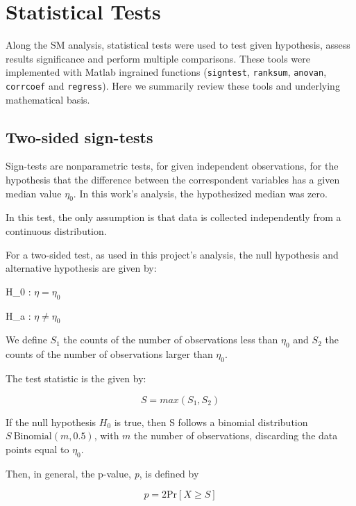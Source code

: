\section{Statistical Tests}
\label{sec:StatisticalTests}

Along the SM analysis, statistical tests were used to test given hypothesis, assess results significance and perform multiple comparisons. These tools were implemented with Matlab ingrained functions (\texttt{signtest}, \texttt{ranksum}, \texttt{anovan}, \texttt{corrcoef} and \texttt{regress}). Here we summarily review these tools and underlying mathematical basis.

\subsection{Two-sided sign-tests}
\label{subsec:signtests}

Sign-tests are nonparametric tests, for given independent observations, for the hypothesis that the difference between the correspondent variables has a given median value $\eta_0$. In this work's analysis, the hypothesized median was zero. 

In this test, the only assumption is that data is collected independently from a continuous distribution.

For a two-sided test, as used in this project's analysis, the null hypothesis and alternative hypothesis are given by:

H_0 : $\eta = \eta _0$

H_a : $\eta \neq \eta _0$

We define $S_1$ the counts of the number of observations less than $\eta _0$ and  $S_2$ the counts of the number of observations larger than $\eta _0$. 

The test statistic is the given by:

\begin{equation}
S=max(S_1, S_2)
\end{equation}

If the null hypothesis $H_0$ is true, then S follows a binomial distribution $S ~ \text{Binomial} (m, 0.5)$, with $m$ the number of observations, discarding the data points equal to $\eta _0$.

Then, in general, the p-value, \textit{p}, is defined by

\begin{equation}
p=2 \text{Pr}\left[ X \geq S \right]
\end{equation}

